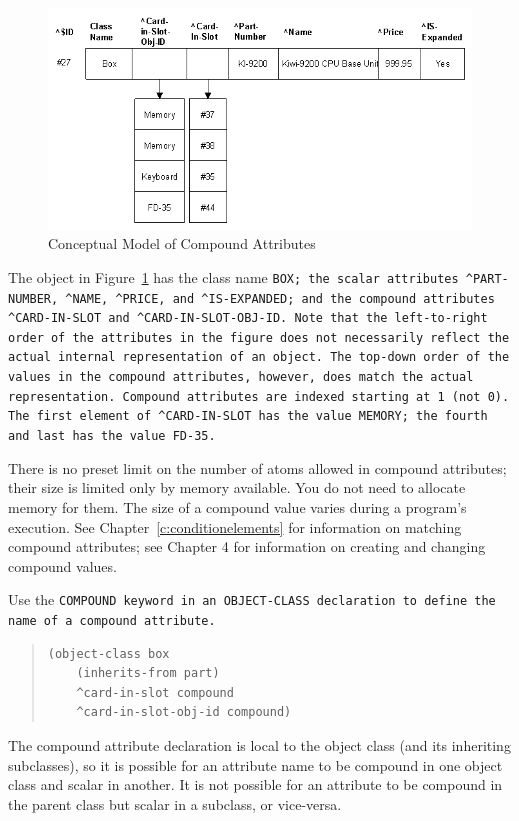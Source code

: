 \begin{figure}[h]
  \centering
  \includegraphics[scale=0.7]{f2-6}
  \caption{Conceptual Model of Compound Attributes}
  \label{f:2-6}
\end{figure}

The object in Figure~\ref{f:2-6} has the class name \tt{BOX}; the scalar
attributes \verb|^PART-NUMBER|, \verb|^NAME|, \verb|^PRICE|, and
\verb|^IS-EXPANDED|; and the compound attributes \verb|^CARD-IN-SLOT|
and \verb|^CARD-IN-SLOT-OBJ-ID|. Note that the left-to-right order of
the attributes in the figure does not necessarily reflect the actual
internal representation of an object. The top-down order of the values
in the compound attributes, however, does match the actual
representation. Compound attributes are indexed starting at 1 (not
0). The first element of \verb|^CARD-IN-SLOT| has the value
\verb|MEMORY|; the fourth and last has the value \verb|FD-35|.

There is no preset limit on the number of atoms allowed in compound
attributes; their size is limited only by memory available. You do not
need to allocate memory for them. The size of a compound value varies
during a program's execution.  See Chapter~\ref{c:conditionelements}
for information on matching compound attributes; see Chapter 4 for
information on creating and changing compound values.

Use the \tt{COMPOUND} keyword in an \tt{OBJECT-CLASS} declaration to
define the name of a compound attribute.
\begin{quote}
\begin{verbatim}
(object-class box
    (inherits-from part)
    ^card-in-slot compound
    ^card-in-slot-obj-id compound)
\end{verbatim}
\end{quote}

The compound attribute declaration is local to the object
class (and its inheriting subclasses), so it is possible for
an attribute name to be compound in one object class and
scalar in another. It is not possible for an attribute to be
compound in the parent class but scalar in a subclass, or
vice-versa.

